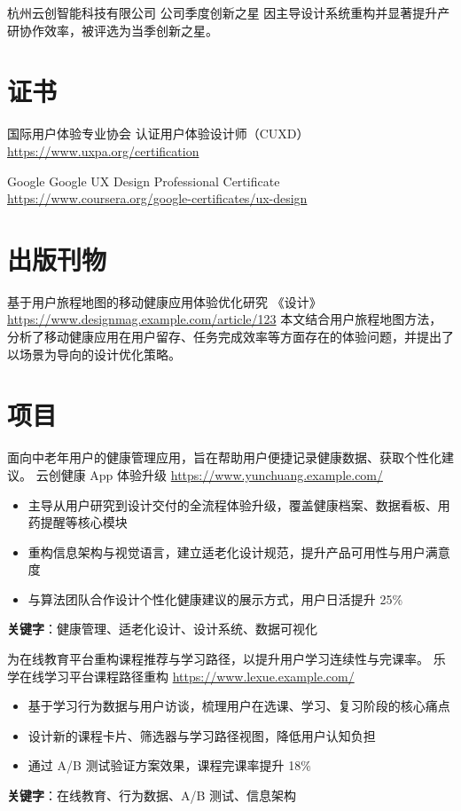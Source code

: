 \documentclass[a4paper, serif, 10pt]{moderncv}
\begin{document}
        {杭州云创智能科技有限公司}
        {公司季度创新之星}
        {}
        {}
        {因主导设计系统重构并显著提升产研协作效率，被评选为当季创新之星。}
\section{证书}

        {国际用户体验专业协会}
        {认证用户体验设计师（CUXD）}
        {\url{https://www.uxpa.org/certification}}
        {}
        {}

        {Google}
        {Google UX Design Professional Certificate}
        {\url{https://www.coursera.org/google-certificates/ux-design}}
        {}
        {}
\section{出版刊物}

        {基于用户旅程地图的移动健康应用体验优化研究}
        {《设计》}
        {\url{https://www.designmag.example.com/article/123}}
        {}
        {本文结合用户旅程地图方法，分析了移动健康应用在用户留存、任务完成效率等方面存在的体验问题，并提出了以场景为导向的设计优化策略。}
\section{项目}

        {面向中老年用户的健康管理应用，旨在帮助用户便捷记录健康数据、获取个性化建议。}
        {云创健康 App 体验升级}
        {\url{https://www.yunchuang.example.com/}}
        {}
        {\begin{itemize}
\item 主导从用户研究到设计交付的全流程体验升级，覆盖健康档案、数据看板、用药提醒等核心模块
\item 重构信息架构与视觉语言，建立适老化设计规范，提升产品可用性与用户满意度
\item 与算法团队合作设计个性化健康建议的展示方式，用户日活提升 25\%
\end{itemize}
\textbf{关键字}：健康管理、适老化设计、设计系统、数据可视化}

        {为在线教育平台重构课程推荐与学习路径，以提升用户学习连续性与完课率。}
        {乐学在线学习平台课程路径重构}
        {\url{https://www.lexue.example.com/}}
        {}
        {\begin{itemize}
\item 基于学习行为数据与用户访谈，梳理用户在选课、学习、复习阶段的核心痛点
\item 设计新的课程卡片、筛选器与学习路径视图，降低用户认知负担
\item 通过 A/B 测试验证方案效果，课程完课率提升 18\%
\end{itemize}
\textbf{关键字}：在线教育、行为数据、A/B 测试、信息架构}
\end{document}
